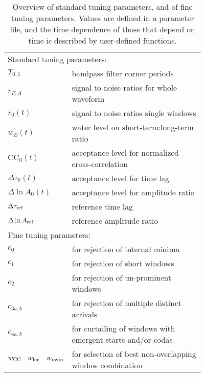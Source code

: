 \begin{table}[h]
\begin{tabular}{lp{0.8\linewidth}}
\hline
\multicolumn{2}{l}{Standard tuning parameters:} \\[5pt]
$T_{0,1}$     & bandpass filter corner periods \\
$r_{P,A}$     & signal to noise ratios for whole waveform \\
$r_0(t)$      & signal to noise ratios single windows \\
$w_E(t)$      & water level on short-term:long-term ratio \\
$\mathrm{CC}_0(t)$          & acceptance level for normalized cross-correlation\\
$\Delta\tau_0(t)$  & acceptance level for time lag \\
$\Delta\ln{A}_0(t)$   & acceptance level for amplitude ratio \\ 
$\Delta\tau_{\rm ref}$ & reference time lag \\
$\Delta\ln{A}_{\rm ref}$ & reference amplitude ratio \\
\hline
\multicolumn{2}{l}{Fine tuning parameters:} \\ [5pt]
$c_0$ & for rejection of internal minima \\
$c_1$ & for rejection of short windows \\
$c_2$ & for rejection of un-prominent windows \\
$c_{3a,b}$  & for rejection of multiple distinct arrivals \\
$c_{4a,b}$  & for curtailing of windows with emergent starts and/or codas \\
$w_{\mathrm{CC}}\quad w_{\rm len}\quad w_{\rm nwin}$ & for selection of best non-overlapping window combination \\
\hline
\end{tabular}
\caption{\label{tb:params}
Overview of standard tuning parameters, and of fine
tuning parameters.  Values are defined in a parameter file, and the
time dependence of those that depend on time is described by user-defined functions.
} 
\end{table}

\pagebreak
